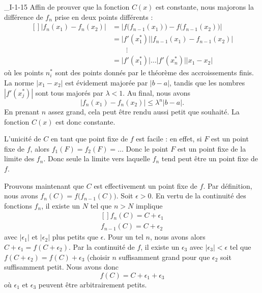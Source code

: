 \begin{corrige}{_I-1-15}
Affin de prouver que la fonction $C(x)$ est constante, nous majorons la différence de $f_n$ prise en deux points différents :
\begin{equation}
	\begin{aligned}[]
		\big| f_n(x_1)-f_n(x_2)  \big|	&=	\Big|  f\big( f_{n-1}(x_1) \big) - f\big(f_{n-1}(x_2) \big)   \Big|\\
						&= \big| f'(x_1^*)\big|	\big|  f_{n-1}(x_1) - f_{n-1}(x_2)  \big|\\
						&\qquad\vdots\\
						&=\big| f'(x_1^*)\big|\ldots	\big| f'(x_n^*)\big|| x_1-x_2  \big|
	\end{aligned}
\end{equation}
où les points $n_i^*$ sont des points donnés par le théorème des accroissements finis. La norme $| x_1-x_{2} |$ est évidement majorée par $| b-a |$, tandis que les nombres $| f'(x^*_j) |$ sont tous majorés par $\lambda<1$. Au final, nous avons
\begin{equation}
	\big| f_n(x_1)-f_n(x_2)  \big|\leq \lambda^n| b-a |.
\end{equation}
En prenant $n$ assez grand, cela peut être rendu aussi petit que souhaité. La fonction $C(x)$ est donc constante.

L'unicité de $C$ en tant que point fixe de $f$ est facile : en effet, si $F$ est un point fixe de $f$, alors $f_1(F)=f_2(F)=\ldots$ Donc le point $F$ est un point fixe de la limite des $f_n$. Donc seule la limite vers laquelle $f_n$ tend peut être un point fixe de $f$.

Prouvons maintenant que $C$ est effectivement un point fixe de $f$. Par définition, nous avons $f_n(C)=f\big( f_{n-1}(C) \big)$. Soit $\epsilon>0$. En vertu de la continuité des fonctions $f_n$, il existe un $N$ tel que $n>N$ implique
\begin{equation}
	\begin{aligned}[]
		f_n(C)=C+\epsilon_1\\
		f_{n-1}(C)=C+\epsilon_2
	\end{aligned}
\end{equation}
avec $| \epsilon_1 |$ et $|\epsilon_2|$ plus petits que $\epsilon$. Pour un tel $n$, nous avons alors $C+\epsilon_1=f(C+\epsilon_2)$. Par la continuité de $f$, il existe un $\epsilon_3$ avec $| \epsilon_3 |<\epsilon$ tel que $f(C+\epsilon_2)=f(C)+\epsilon_3$ (choisir $n$ suffisamment grand pour que $\epsilon_2$ soit suffisamment petit. Nous avons donc
\begin{equation}
	f(C)=C+\epsilon_1+\epsilon_3
\end{equation}
où $\epsilon_1$ et $\epsilon_3$ peuvent être arbitrairement petits.

\end{corrige}
